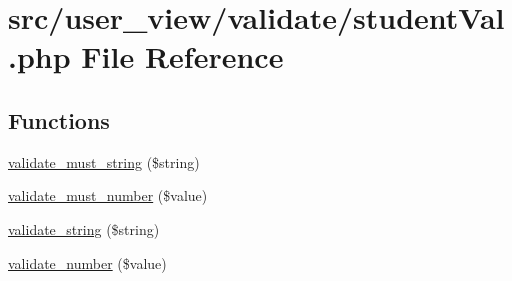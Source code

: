 \hypertarget{user__view_2validate_2studentVal_8php}{\section{src/user\-\_\-view/validate/student\-Val.php \-File \-Reference}
\label{user__view_2validate_2studentVal_8php}
}
\subsection*{\-Functions}
\begin{DoxyCompactItemize}
\item 
\hyperlink{user__view_2validate_2studentVal_8php_ae691057ba3589c9a4bfec6db69d2f9f2}{validate\-\_\-must\-\_\-string} (\$string)
\item 
\hyperlink{user__view_2validate_2studentVal_8php_a7e94e55a79b165d62be4f28aca0948f3}{validate\-\_\-must\-\_\-number} (\$value)
\item 
\hyperlink{user__view_2validate_2studentVal_8php_aa50ed44a88627d8a784a9063901a8dc3}{validate\-\_\-string} (\$string)
\item 
\hyperlink{user__view_2validate_2studentVal_8php_ad16f757f42ae1a67613788baefd3bc51}{validate\-\_\-number} (\$value)
\end{DoxyCompactItemize}
